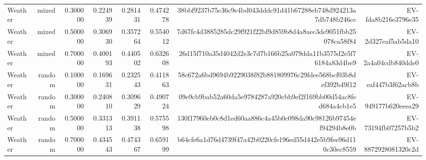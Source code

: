 \begin{tabular}{lrrrrrrr}
Weather & mixed & 0.300000 & 0.224939 & 0.281431 & 0.474278 & 38bbf9237b75c36c9e4bd043dddc91d41b67288eb748d924213a7db748b246cc & EV-fda8b216e3796e35 \\
Weather & mixed & 0.500000 & 0.306930 & 0.357264 & 0.554012 & 7d67fc4d3885285dc29f921f22bf9d859b8d4a8aec3de9051fbb25078ca58f84 & EV-2d327eaf5ab5da10 \\
Weather & mixed & 0.700000 & 0.400193 & 0.440502 & 0.632608 & 26d15f710a35d4042d2e3c7d7b166b25a079dda11b3575d2e5f76184a83d4be9 & EV-2a4a04cdb840dde0 \\
Weather & random & 0.100000 & 0.169631 & 0.232543 & 0.411863 & 58c672a6bd9694b9229038f82b881809976c29fdee568bcf03b8def392b49f12 & EV-eaf447b3f62acb8b \\
Weather & random & 0.300000 & 0.240810 & 0.309629 & 0.490724 & 09e9cb9bab52a60da5e9784287a920cbb9ef2f169bb00d54ac8fed684a4cb1e5 & EV-949177b620eeea29 \\
Weather & random & 0.500000 & 0.331313 & 0.391138 & 0.575598 & 130f17960eb0c8d1ed60aa886c4a45b0c098da90c98126b97454ef94294b8e0b & EV-73194fb07257b5b2 \\
Weather & random & 0.700000 & 0.434543 & 0.474367 & 0.659199 & b64cfe6a1d76d4739f47a42b0220cfe196ed55d442e5b9fee96d110c30ec8559 & EV-8872928081320c2d \\
\hline
\end{tabular}
